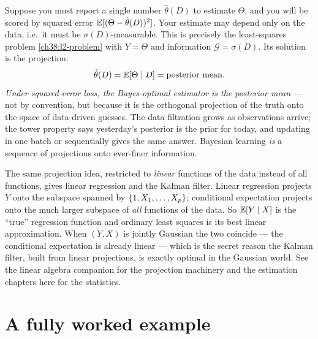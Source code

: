 \begin{applicationbox}
Suppose you must report a single number $\hat\theta(D)$ to estimate $\Theta$, and you will be scored
by squared error $\operatorname{\mathbb{E}}[(\Theta - \hat\theta(D))^2]$. Your estimate may depend only on the data, i.e.\ it
must be $\sigma(D)$-measurable. This is precisely the least-squares problem
\eqref{ch38:l2-problem} with $Y = \Theta$ and information $\mathcal{G} = \sigma(D)$. Its solution is
the projection:
\[
  \hat\theta(D) = \operatorname{\mathbb{E}}[\Theta \mid D] = \text{posterior mean}.
\]
\emph{Under squared-error loss, the Bayes-optimal estimator is the posterior mean} --- not by
convention, but because it is the orthogonal projection of the truth onto the space of data-driven
guesses. The data filtration grows as observations arrive; the tower property says yesterday's
posterior is the prior for today, and updating in one batch or sequentially gives the same answer.
Bayesian learning \emph{is} a sequence of projections onto ever-finer information.
\end{applicationbox}

\begin{connectionbox}
The same projection idea, restricted to \emph{linear} functions of the data instead of all functions,
gives linear regression and the Kalman filter. Linear regression projects $Y$ onto the subspace
spanned by $\{1, X_1, \dots, X_p\}$; conditional expectation projects onto the much larger subspace
of \emph{all} functions of the data. So $\operatorname{\mathbb{E}}[Y\mid X]$ is the ``true'' regression function and
ordinary least squares is its best linear approximation. When $(Y, X)$ is jointly Gaussian the two
coincide --- the conditional expectation is already linear --- which is the secret reason the Kalman
filter, built from linear projections, is exactly optimal in the Gaussian world. See the linear
algebra companion for the projection machinery and the estimation chapters here for the statistics.
\end{connectionbox}

\section{A fully worked example}
\label{ch38:worked}

